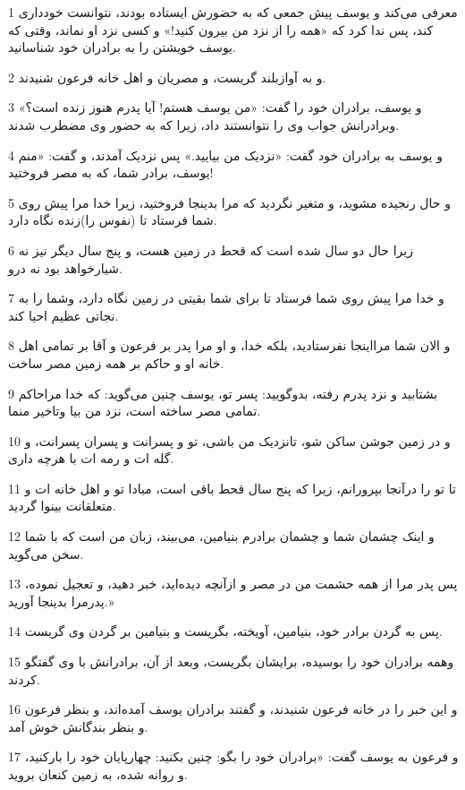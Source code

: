 \par 1 معرفی می‌کند و یوسف پیش جمعی که به حضورش ایستاده بودند، نتوانست خودداری کند، پس ندا کرد که «همه را از نزد من بیرون کنید!» و کسی نزد او نماند، وقتی که یوسف خویشتن را به برادران خود شناسانید.
\par 2 و به آوازبلند گریست، و مصریان و اهل خانه فرعون شنیدند.
\par 3 و یوسف، برادران خود را گفت: «من یوسف هستم! آیا پدرم هنوز زنده است؟» وبرادرانش جواب وی را نتوانستند داد، زیرا که به حضور وی مضطرب شدند.
\par 4 و یوسف به برادران خود گفت: «نزدیک من بیایید.» پس نزدیک آمدند، و گفت: «منم یوسف، برادر شما، که به مصر فروختید!
\par 5 و حال رنجیده مشوید، و متغیر نگردید که مرا بدینجا فروختید، زیرا خدا مرا پیش روی شما فرستاد تا (نفوس را)زنده نگاه دارد.
\par 6 زیرا حال دو سال شده است که قحط در زمین هست، و پنج سال دیگر نیز نه شیارخواهد بود نه درو.
\par 7 و خدا مرا پیش روی شما فرستاد تا برای شما بقیتی در زمین نگاه دارد، وشما را به نجاتی عظیم احیا کند.
\par 8 و الان شما مرااینجا نفرستادید، بلکه خدا، و او مرا پدر بر فرعون و آقا بر تمامی اهل خانه او و حاکم بر همه زمین مصر ساخت.
\par 9 بشتابید و نزد پدرم رفته، بدوگویید: پسر تو، یوسف چنین می‌گوید: که خدا مراحاکم تمامی مصر ساخته است، نزد من بیا وتاخیر منما.
\par 10 و در زمین جوشن ساکن شو، تانزدیک من باشی، تو و پسرانت و پسران پسرانت، و گله ات و رمه ات با هر‌چه داری.
\par 11 تا تو را درآنجا بپرورانم، زیرا که پنج سال قحط باقی است، مبادا تو و اهل خانه ات و متعلقانت بینوا گردید.
\par 12 و اینک چشمان شما و چشمان برادرم بنیامین، می‌بیند، زبان من است که با شما سخن می‌گوید.
\par 13 پس پدر مرا از همه حشمت من در مصر و ازآنچه دیده‌اید، خبر دهید، و تعجیل نموده، پدرمرا بدینجا آورید.»
\par 14 پس به گردن برادر خود، بنیامین، آویخته، بگریست و بنیامین بر گردن وی گریست.
\par 15 وهمه برادران خود را بوسیده، برایشان بگریست، وبعد از آن، برادرانش با وی گفتگو کردند.
\par 16 و این خبر را در خانه فرعون شنیدند، و گفتند برادران یوسف آمده‌اند، و بنظر فرعون و بنظر بندگانش خوش آمد.
\par 17 و فرعون به یوسف گفت: «برادران خود را بگو: چنین بکنید: چهارپایان خود را بارکنید، و روانه شده، به زمین کنعان بروید.
